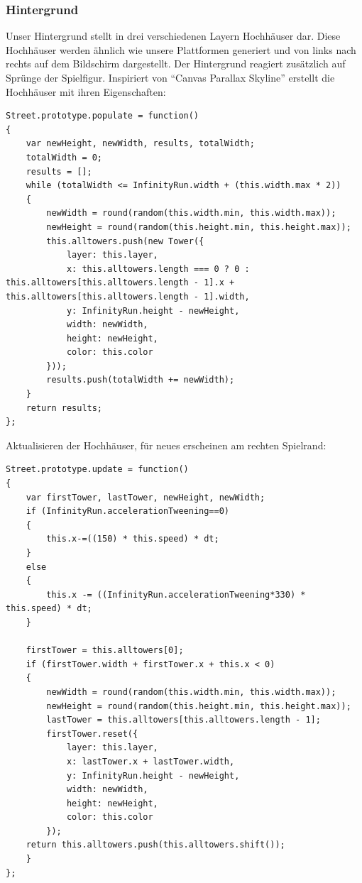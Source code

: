 \subsubsection{Hintergrund}
Unser Hintergrund stellt in drei verschiedenen Layern Hochhäuser dar. Diese Hochhäuser werden ähnlich wie unsere Plattformen generiert und von links nach rechts auf dem Bildschirm dargestellt. Der Hintergrund reagiert zusätzlich auf Sprünge der Spielfigur. Inspiriert von ``Canvas Parallax Skyline'' \cite{background}
erstellt die Hochhäuser mit ihren Eigenschaften:
\begin{lstlisting}[frame=single]
Street.prototype.populate = function() 
{
	var newHeight, newWidth, results, totalWidth;
	totalWidth = 0;
	results = [];
	while (totalWidth <= InfinityRun.width + (this.width.max * 2)) 
	{
		newWidth = round(random(this.width.min, this.width.max));
		newHeight = round(random(this.height.min, this.height.max));
		this.alltowers.push(new Tower({
			layer: this.layer,
			x: this.alltowers.length === 0 ? 0 : this.alltowers[this.alltowers.length - 1].x + this.alltowers[this.alltowers.length - 1].width,
			y: InfinityRun.height - newHeight,
			width: newWidth,
			height: newHeight,
			color: this.color
		}));
		results.push(totalWidth += newWidth);
	}
	return results;
};
\end{lstlisting}
Aktualisieren der Hochhäuser, für neues erscheinen am rechten Spielrand:
\begin{lstlisting}[frame=single]
Street.prototype.update = function() 
{
	var firstTower, lastTower, newHeight, newWidth;
	if (InfinityRun.accelerationTweening==0)
	{
		this.x-=((150) * this.speed) * dt;
	}
	else
	{
		this.x -= ((InfinityRun.accelerationTweening*330) * this.speed) * dt;
	}

	firstTower = this.alltowers[0];
	if (firstTower.width + firstTower.x + this.x < 0) 
	{
		newWidth = round(random(this.width.min, this.width.max));
		newHeight = round(random(this.height.min, this.height.max));
		lastTower = this.alltowers[this.alltowers.length - 1];
		firstTower.reset({
			layer: this.layer,
			x: lastTower.x + lastTower.width,
			y: InfinityRun.height - newHeight,
			width: newWidth,
			height: newHeight,
			color: this.color
		});
	return this.alltowers.push(this.alltowers.shift());
	}
};
\end{lstlisting}
\newpage
